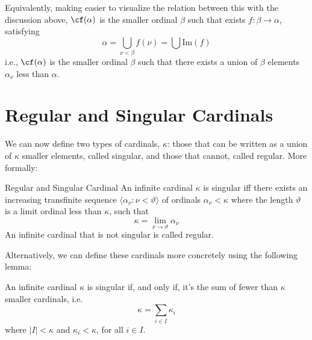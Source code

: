 Equivalently, making easier to visualize the relation between this with the discussion above, $\cf(\alpha)$ is the smaller ordinal $\beta$ such that exists $f:\beta\to\alpha$, satisfying
$$\alpha=\bigcup_{\nu<\beta}f(\nu)=\bigcup\text{Im}(f)$$
i.e., $\cf(\alpha)$ is the smaller ordinal $\beta$ such that there exists a union of $\beta$ elements $\alpha_\nu$ less than $\alpha$.

\section{Regular and Singular Cardinals}

We can now define two types of cardinals, $\kappa$: those that can be written as a union of $\kappa$ smaller elements, called singular, and those that cannot, called regular. More formally:

\begin{definition}{Regular and Singular Cardinal}{}
    An infinite cardinal $\kappa$ is \textcolor{laser_eyes!80!black}{singular} iff there exists an increasing transfinite sequence $\langle\alpha_\nu:\nu<\vartheta\rangle$ of ordinals $\alpha_\nu<\kappa$ where the length $\vartheta$ is a limit ordinal less than $\kappa$, such that
    $$\kappa=\lim_{\nu\to\vartheta}\alpha_\nu$$
    An infinite cardinal that is not singular is called \textcolor{laser_eyes!80!black}{regular}.
\end{definition}

Alternatively, we can define these cardinals more concretely using the following lemma:

\begin{lemma}{}{}
\label{sing-sum}
    An infinite cardinal $\kappa$ is singular if, and only if, it's the sum of fewer than $\kappa$ smaller cardinals, i.e.
    $$\kappa=\sum_{i\in I}\kappa_i$$
    where $|I|<\kappa$ and $\kappa_i<\kappa$, for all $i\in I$.
\end{lemma}

